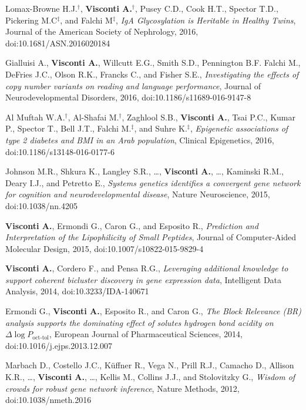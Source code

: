 \documentclass[a4paper,10pt]{article}
\begin{document}
{\begin{itemize}
		 Lomax-Browne H.J.$^{\textbf{$\dag $}}$, \textbf{Visconti A.}$^{\textbf{$\dag $}}$, Pusey C.D., Cook H.T., Spector T.D., Pickering M.C$^{\textbf{$\ddag $}}$, and Falchi M$^{\textbf{$\ddag $}}$, \emph{IgA Glycosylation is Heritable in Healthy Twins}, Journal of the American Society of Nephrology, 2016, doi:10.1681/ASN.2016020184

		 Gialluisi A., \textbf{Visconti A.}, Willcutt E.G., Smith S.D., Pennington B.F. Falchi M., DeFries J.C.,  Olson R.K., Francks C., and Fisher S.E., \emph{Investigating the effects of copy number variants on reading and language performance}, Journal of Neurodevelopmental Disorders, 2016, doi:10.1186/s11689-016-9147-8

		 Al Muftah W.A.$^{\textbf{$\dag $}}$, Al-Shafai M.$^{\textbf{$\dag $}}$, Zaghlool S.B., \textbf{Visconti A.}, Tsai P.C., Kumar P., Spector T., Bell J.T., Falchi M.$^{\textbf{$\ddag $}}$, and Suhre K.$^{\textbf{$\ddag $}}$, \emph{Epigenetic associations of type 2 diabetes and BMI in an Arab population}, Clinical Epigenetics, 2016, doi:10.1186/s13148-016-0177-6

		 Johnson M.R., Shkura K., Langley S.R., \dots, \textbf{Visconti A.}, \dots, Kaminski R.M., Deary I.J., and Petretto E., \emph{Systems genetics identifies a convergent gene network for cognition and neurodevelopmental disease}, Nature Neuroscience, 2015, doi:10.1038/nn.4205

		 \textbf{Visconti A.}, Ermondi G., Caron G., and Esposito R., \emph{Prediction and Interpretation of the Lipophilicity of Small Peptides}, Journal of Computer-Aided Molecular Design, 2015, doi:10.1007/s10822-015-9829-4

		 \textbf{Visconti A.}, Cordero F., and Pensa R.G., \emph{Leveraging additional knowledge to support coherent bicluster discovery in gene expression data}, Intelligent Data Analysis, 2014, doi:10.3233/IDA-140671

		 Ermondi G., \textbf{Visconti A.}, Esposito R., and Caron G., \emph{The Block Relevance (BR) analysis supports the dominating effect of solutes hydrogen bond acidity on $\Delta \log P_{\text{oct-tol}}$}, European Journal of Pharmaceutical Sciences, 2014, doi:10.1016/j.ejps.2013.12.007

		 Marbach D., Costello J.C., K\"{u}ffner R., Vega N., Prill R.J., Camacho D., Allison K.R., \dots, \textbf{Visconti A.}, \dots, Kellis M., Collins J.J., and Stolovitzky G., \emph{Wisdom of crowds for robust gene network inference}, Nature Methods, 2012, doi:10.1038/nmeth.2016
 	\end{itemize}
}
\end{document}
